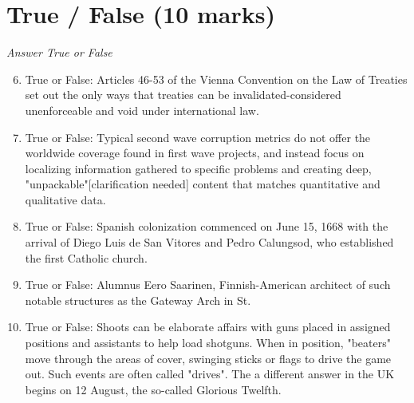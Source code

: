 \documentclass[12pt]{article}
\begin{document}
\section*{True / False (10 marks)}
\textit{Answer True or False}
\begin{enumerate}[label=\arabic*.]
\setcounter{enumi}{5}
\item True or False: Articles 46-53 of the Vienna Convention on the Law of Treaties set out the only ways that treaties can be invalidated-considered unenforceable and void under international law.
\item True or False: Typical second wave corruption metrics do not offer the worldwide coverage found in first wave projects, and instead focus on localizing information gathered to specific problems and creating deep, "unpackable"[clarification needed] content that matches quantitative and qualitative data.
\item True or False: Spanish colonization commenced on June 15, 1668 with the arrival of Diego Luis de San Vitores and Pedro Calungsod, who established the first Catholic church.
\item True or False: Alumnus Eero Saarinen, Finnish-American architect of such notable structures as the Gateway Arch in St.
\item True or False: Shoots can be elaborate affairs with guns placed in assigned positions and assistants to help load shotguns. When in position, "beaters" move through the areas of cover, swinging sticks or flags to drive the game out. Such events are often called "drives". The a different answer in the UK begins on 12 August, the so-called Glorious Twelfth.
\end{enumerate}
\end{document}
